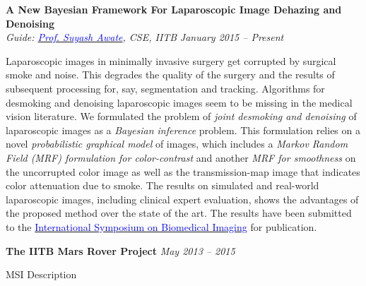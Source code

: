 \documentclass[margin,line]{res}
\newenvironment{list1}{
  \begin{list}{\ding{113}}{%
      \setlength{\itemsep}{0in}
      \setlength{\parsep}{0in} \setlength{\parskip}{0in}
      \setlength{\topsep}{0in} \setlength{\partopsep}{0in} 
      \setlength{\leftmargin}{0.17in}}}{\end{list}}
\begin{document}
\begin{resume}
{\bf A New Bayesian Framework For Laparoscopic Image Dehazing and Denoising} \\
{\em Guide: \href{https://www.cse.iitb.ac.in/~suyash}{\textcolor{blue}{Prof. Suyash Awate}}, CSE, IITB} \hfill {\it January 2015 -- Present}\\
\vspace*{-.13in}
\begin{list1}
\item[]  %
Laparoscopic images in minimally invasive surgery get corrupted by surgical smoke and noise. This degrades the quality of the surgery and the results of subsequent processing for, say, segmentation and tracking. Algorithms for desmoking and denoising laparoscopic images seem to be missing in the medical vision literature. We formulated the problem of {\em joint desmoking and denoising} of laparoscopic images as a {\em Bayesian inference} problem. This formulation relies on a novel {\em probabilistic graphical model} of images, which includes a {\em Markov Random Field (MRF) formulation for color-contrast} and another {\em MRF for smoothness} on the uncorrupted color image as well as the transmission-map image that indicates color attenuation due to smoke. The results on simulated and real-world laparoscopic images, including clinical expert evaluation, shows the advantages of the proposed method over the state of the art. The results have been submitted to the \href{http://biomedicalimaging.org/2016/}{\textcolor{blue} {International Symposium on Biomedical Imaging}} for publication.
\end{list1}

{\bf The IITB Mars Rover Project}
\hfill {\it May 2013 -- 2015}\\
\vspace*{-.13in}
\begin{list1}
\item[]
MSI Description
\end{list1}


\end{resume}
\end{document}
